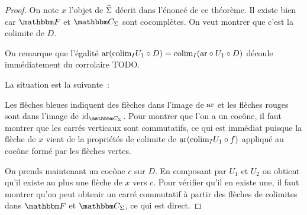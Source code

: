 \begin{proof}
    On note $x$ l'objet de $\widetilde{\Sigma}$ décrit dans l'énoncé de ce théorème. Il existe
    bien car $\cf$ et $\C_\Sigma$ sont cocomplètes. On veut
    montrer que c'est la colimite de $D$.

    On remarque que l'égalité $\text{ar}(\text{colim}_I U_1\circ D) = \text{colim}_I (\text{ar}\circ U_1\circ D)$
    découle immédiatement du corrolaire TODO.

    La situation est la suivante~:

    \begin{center}\end{center}

    Les flèches bleues indiquent des flèches dans l'image de $\text{ar}$ et les flèches
    rouges sont dans l'image de $\id_{\C_\Sigma}$. Pour montrer que l'on a un cocône,
    il faut montrer que les carrés verticaux sont commutatifs, ce qui est immédiat
    puisque la flèche de $x$ vient de la propriétés de colimite de
    $\text{ar}(\text{colim}_I U_1\circ f)$ appliqué au cocône formé par les flèches vertes.

    On prends maintenant un cocône $c$ sur $D$. En composant par $U_1$ et $U_2$ on obtient
    qu'il existe au plus une flèche de $x$ vers $c$. Pour vérifier qu'il en existe une,
    il faut montrer qu'on peut obtenir un carré commutatif à partir des flèches de
    colimites dans $\cf$ et $\C_\Sigma$, ce qui est direct.
\end{proof}

